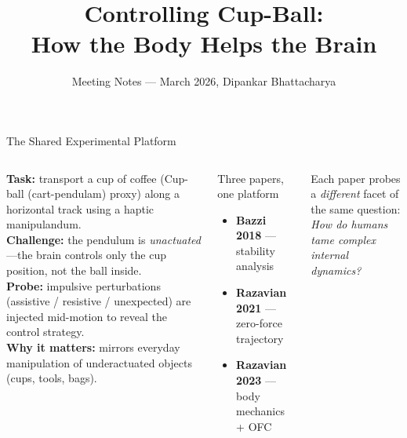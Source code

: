 \documentclass[aspectratio=169,10pt]{beamer}
\title{Controlling Cup-Ball:\\How the Body Helps the Brain}
\subtitle{}
\author{Meeting Notes --- March 2026, Dipankar Bhattacharya}
\date{}
\begin{document}
\maketitle

\begin{frame}{The Shared Experimental Platform}
\begin{columns}[T]
  \textbf{Task:} transport a cup of coffee (Cup-ball (cart-pendulam) proxy) along a
  horizontal track using a haptic manipulandum.\\[6pt]
  \textbf{Challenge:} the pendulum is \emph{unactuated}---the brain controls
  only the cup position, not the ball inside.\\[6pt]
  \textbf{Probe:} impulsive perturbations (assistive / resistive / unexpected)
  are injected mid-motion to reveal the control strategy.\\[6pt]
  \textbf{Why it matters:} mirrors everyday manipulation of underactuated
  objects (cups, tools, bags).

  \begin{block}{Three papers, one platform}
    \begin{itemize}\setlength\itemsep{4pt}
      \item \textbf{Bazzi 2018} --- stability analysis
      \item \textbf{Razavian 2021} --- zero-force trajectory
      \item \textbf{Razavian 2023} --- body mechanics + OFC
    \end{itemize}
  \end{block}
  \vspace{4pt}
  Each paper probes a \emph{different} facet of the same question:\\
  \emph{How do humans tame complex internal dynamics?}
\end{columns}
\end{frame}
\end{document}
